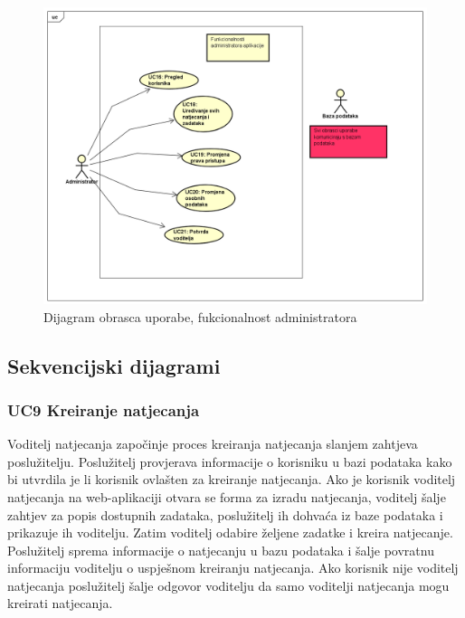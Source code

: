 					\eject
					
					\begin{figure}[H]
						\includegraphics[scale=0.5]{slike/Administrator.PNG} %
						\centering
						\caption{Dijagram obrasca uporabe, fukcionalnost administratora}
						\label{fig:obrasci2}
					\end{figure}
				\eject

			\subsection{Sekvencijski dijagrami}

				\vspace{10mm}
				\subsubsection*{UC9 Kreiranje natjecanja}
				
				Voditelj natjecanja započinje proces kreiranja natjecanja slanjem zahtjeva poslužitelju. Poslužitelj provjerava informacije o korisniku u bazi podataka kako bi utvrdila je li korisnik ovlašten za kreiranje natjecanja. Ako je korisnik voditelj natjecanja na web-aplikaciji otvara se forma za izradu natjecanja, voditelj šalje zahtjev za popis dostupnih zadataka, poslužitelj ih dohvaća iz baze podataka i prikazuje ih voditelju. Zatim voditelj odabire željene zadatke i kreira natjecanje. Poslužitelj sprema informacije o natjecanju u bazu podataka i šalje povratnu informaciju voditelju o uspješnom kreiranju natjecanja. Ako korisnik nije voditelj natjecanja poslužitelj šalje odgovor voditelju da samo voditelji natjecanja mogu kreirati natjecanja.
				\vspace{20mm}


